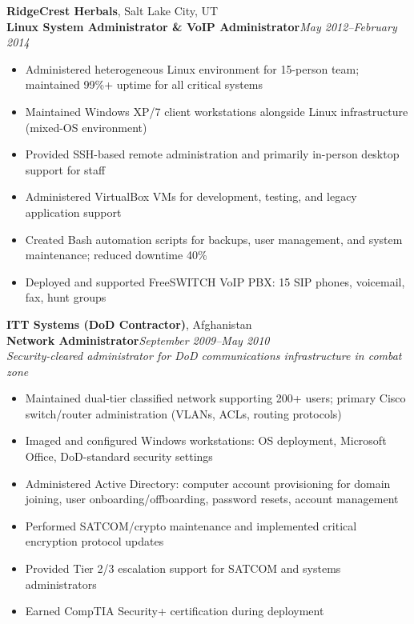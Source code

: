 \documentclass[9pt,letterpaper]{extarticle}
\begin{document}
\vspace{5pt}
\noindent\textbf{RidgeCrest Herbals}, Salt Lake City, UT\\
\textbf{Linux System Administrator \& VoIP Administrator}\hfill\textit{May 2012--February 2014}
\begin{itemize}
  \item Administered heterogeneous Linux environment for 15-person team; maintained 99\%+ uptime for all critical systems
  \item Maintained Windows XP/7 client workstations alongside Linux infrastructure (mixed-OS environment)
  \item Provided SSH-based remote administration and primarily in-person desktop support for staff
  \item Administered VirtualBox VMs for development, testing, and legacy application support
  \item Created Bash automation scripts for backups, user management, and system maintenance; reduced downtime 40\%
  \item Deployed and supported FreeSWITCH VoIP PBX: 15 SIP phones, voicemail, fax, hunt groups
\end{itemize}

\vspace{5pt}
\noindent\textbf{ITT Systems (DoD Contractor)}, Afghanistan\\
\textbf{Network Administrator}\hfill\textit{September 2009--May 2010}\\
\textit{Security-cleared administrator for DoD communications infrastructure in combat zone}
\begin{itemize}
  \item Maintained dual-tier classified network supporting 200+ users; primary Cisco switch/router administration (VLANs, ACLs, routing protocols)
  \item Imaged and configured Windows workstations: OS deployment, Microsoft Office, DoD-standard security settings
  \item Administered Active Directory: computer account provisioning for domain joining, user onboarding/offboarding, password resets, account management
  \item Performed SATCOM/crypto maintenance and implemented critical encryption protocol updates
  \item Provided Tier 2/3 escalation support for SATCOM and systems administrators
  \item Earned CompTIA Security+ certification during deployment
\end{itemize}
\end{document}
